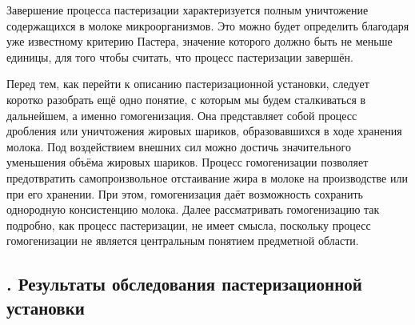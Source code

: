 {  \par \redline Завершение процесса пастеризации характеризуется полным уничтожение содержащихся в молоке микроорганизмов. Это можно будет определить благодаря уже известному критерию Пастера, значение которого должно быть не меньше единицы, для того чтобы считать, что процесс пастеризации завершён.

  \par \redline Перед тем, как перейти к описанию пастеризационной установки, следует коротко разобрать ещё одно понятие, с которым мы будем сталкиваться в дальнейшем, а именно гомогенизация. Она представляет собой процесс дробления или уничтожения жировых шариков, образовавшихся в ходе хранения молока. Под воздействием внешних сил можно достичь значительного уменьшения объёма жировых шариков. Процесс гомогенизации позволяет предотвратить самопроизвольное отстаивание жира в молоке на производстве или при его хранении. При этом, гомогенизация даёт возможность сохранить однородную консистенцию молока. Далее рассматривать гомогенизацию так подробно, как процесс пастеризации, не имеет смысла, поскольку процесс гомогенизации не является центральным понятием предметной области.

  \par
}

\subtitlespace

\subsection*{ 
  \gostTitleFont
  \redline
  \thechaptercntr .\thesubchaptercntr \spc
  Результаты обследования пастеризационной установки
} \addtocounter{subchaptercntr}{1}

\subtitlespace

